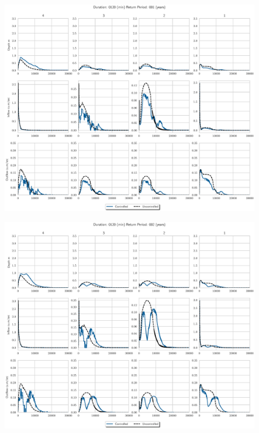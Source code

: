 \begin{figure}
    \centering
    \includegraphics[width=\linewidth]{./RL-SI-figures/77storms/0120001.eps}
\end{figure}
\begin{figure}
    \centering
    \includegraphics[width=\linewidth]{./RL-SI-figures/77storms/0120002.eps}
\end{figure}
